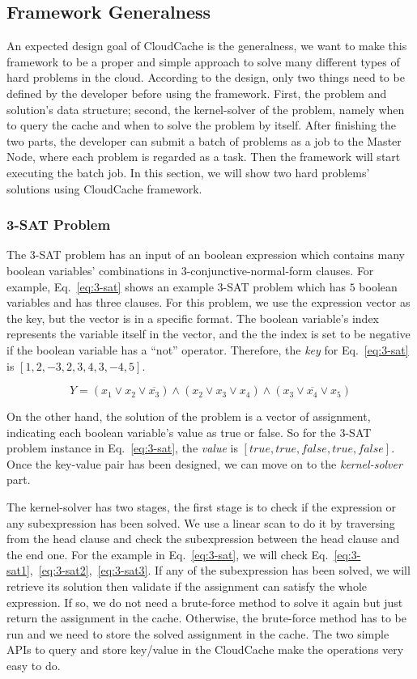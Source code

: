 \subsection{Framework Generalness}
An expected design goal of CloudCache is the generalness, we want to make this framework to be a proper and simple approach to solve many different types of hard problems in the cloud. According to the design, only two things need to be defined by the developer before using the framework. First, the problem and solution's data structure; second, the kernel-solver of the problem, namely when to query the cache and when to solve the problem by itself. After finishing the two parts, the developer can submit a batch of problems as a job to the Master Node, where each problem is regarded as a task. Then the framework will start executing the batch job. In this section, we will show two hard problems' solutions using CloudCache framework.

\subsubsection{3-SAT Problem}
The 3-SAT problem has an input of an boolean expression which contains many boolean variables' combinations in 3-conjunctive-normal-form clauses. For example, Eq.~\ref{eq:3-sat} shows an example 3-SAT problem which has $5$ boolean variables and has three clauses. For this problem, we use the expression vector as the key, but the vector is in a specific format. The boolean variable's index represents the variable itself in the vector, and the the index is set to be negative if the boolean variable has a ``not'' operator. Therefore, the \emph{key} for Eq.~\ref{eq:3-sat} is $[1,2,-3,2,3,4,3,-4,5]$.

\begin{equation}
Y = (x_1 \vee x_2 \vee \overline{x_3}) \wedge (x_2 \vee x_3 \vee x_4) \wedge (x_3 \vee \overline{x_4} \vee x_5)
\label{eq:3-sat}
\end{equation}

On the other hand, the solution of the problem is a vector of assignment, indicating each boolean variable's value as true or false. So for the 3-SAT problem instance in Eq.~\ref{eq:3-sat}, the \emph{value} is $[true, true, false, true, false]$. Once the key-value pair has been designed, we can move on to the \emph{kernel-solver} part.

The kernel-solver has two stages, the first stage is to check if the expression or any subexpression has been solved. We use a linear scan to do it by traversing from the head clause and check the subexpression between the head clause and the end one. For the example in Eq.~\ref{eq:3-sat}, we will check Eq.~\ref{eq:3-sat1},~\ref{eq:3-sat2},~\ref{eq:3-sat3}. If any of the subexpression has been solved, we will retrieve its solution then validate if the assignment can satisfy the whole expression. If so, we do not need a brute-force method to solve it again but just return the assignment in the cache. Otherwise, the brute-force method has to be run and we need to store the solved assignment in the cache. The two simple APIs to query and store key/value in the CloudCache make the operations very easy to do.

